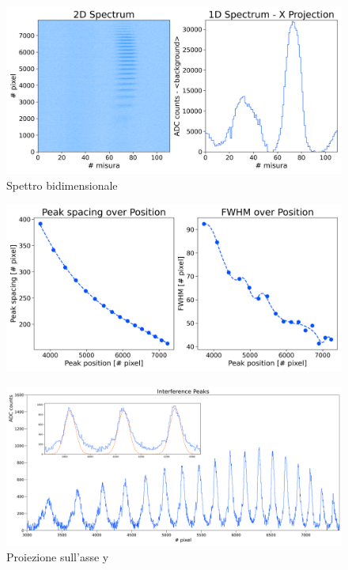 \documentclass[twocolumn,10pt]{asme2ej}
\begin{document}
\begin{figure}
    \centering
    \includegraphics[width=\linewidth]{../Plots/Boff_2d_spectrum.png}
    \caption{Spettro bidimensionale}
    \label{i:spettro2d_Boff}
\end{figure}


\begin{figure}
    \centering
    \includegraphics[width=\linewidth]{../Plots/Boff_spacing_trend.png}
    \caption{}
    \label{i:spacing_trend_Boff}
\end{figure}


\begin{figure}
    \centering
    \includegraphics[width=\textwidth]{../Plots/Boff_Y_proj.png}
    \caption{Proiezione sull'asse y}
    \label{i:spettro2d_Boff_ProjY}
\end{figure}
\end{document}
